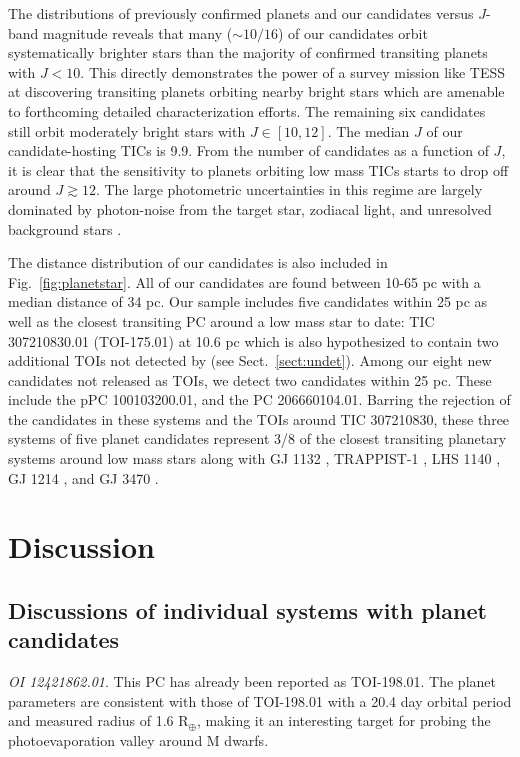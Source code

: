 The distributions of previously confirmed planets
and our candidates versus $J$-band magnitude reveals that many ($\sim 10/16$) of our candidates
orbit systematically brighter stars than the majority of confirmed transiting planets with
$J<10$. This directly demonstrates the power of a survey mission like TESS at discovering
transiting planets orbiting nearby bright stars which are amenable to forthcoming detailed
characterization efforts. The remaining six candidates still orbit moderately
bright stars with $J \in [10,12]$. The median $J$ of our candidate-hosting TICs is 9.9.
From the number of \pipeline{} candidates as a function of $J$,
it is clear that the \pipeline{} sensitivity to planets orbiting low mass TICs starts to drop
off around $J \gtrsim 12$.
The large photometric uncertainties in this regime are largely dominated by photon-noise
from the target star, zodiacal light, and unresolved background stars \citep{ricker15}.

The distance distribution of our candidates is also included in Fig.~\ref{fig:planetstar}. All of
our candidates are found between 10-65 pc with a median distance of 34 pc. Our sample includes
five candidates within 25 pc as well as the closest transiting PC around a low mass star to date:
TIC 307210830.01 (TOI-175.01) at 10.6 pc which is also hypothesized to contain two additional TOIs
not detected by \pipeline{} (see Sect.~\ref{sect:undet}). Among our eight new candidates not
released as TOIs, we detect two candidates within 25 pc. These include the pPC 100103200.01,
and the PC 206660104.01. Barring the rejection of the candidates in
these systems and the TOIs around TIC 307210830, these three systems of five planet candidates
represent 3/8 of the
closest transiting planetary systems around low mass stars along with GJ 1132 \citep{berta15,bonfils18},
TRAPPIST-1 \citep{gillon17,luger17}, LHS 1140 \citep{dittmann17a,ment18}, GJ 1214 \citep{charbonneau09}, and
GJ 3470 \citep{bonfils12}.


\section{Discussion} \label{sect:disc}
\subsection{Discussions of individual systems with planet candidates} \label{sect:indiv}
\emph{OI 12421862.01}. This PC has already been reported as TOI-198.01. The \pipeline{} planet parameters
are consistent with those of TOI-198.01 with a 20.4 day orbital period and measured
radius of 1.6 R$_{\oplus}$, making it an interesting target for probing the photoevaporation valley
around M dwarfs.

